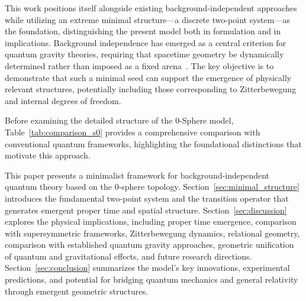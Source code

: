 \documentclass[%
 reprint,
 amsmath,amssymb,
 aps,
]{revtex4-1}
\numberwithin{equation}{section}%
\begin{document}
This work positions itself alongside existing background-independent approaches while utilizing an extreme minimal structure—a discrete two-point system—as the foundation, distinguishing the present model both in formulation and in implications. Background independence has emerged as a central criterion for quantum gravity theories, requiring that spacetime geometry be dynamically determined rather than imposed as a fixed arena~\cite{ashtekar2004}. The key objective is to demonstrate that such a minimal seed can support the emergence of physically relevant structures, potentially including those corresponding to Zitterbewegung and internal degrees of freedom.

Before examining the detailed structure of the 0-Sphere model, Table~\ref{tab:comparison_s0} provides a comprehensive comparison with conventional quantum frameworks, highlighting the foundational distinctions that motivate this approach.

This paper presents a minimalist framework for background-independent quantum theory based on the 0-sphere topology. Section~\ref{sec:minimal_structure} introduces the fundamental two-point system and the transition operator that generates emergent proper time and spatial structure. Section~\ref{sec:discussion} explores the physical implications, including proper time emergence, comparison with supersymmetric frameworks, Zitterbewegung dynamics, relational geometry, comparison with established quantum gravity approaches, geometric unification of quantum and gravitational effects, and future research directions. Section~\ref{sec:conclusion} summarizes the model's key innovations, experimental predictions, and potential for bridging quantum mechanics and general relativity through emergent geometric structures.
\end{document}
